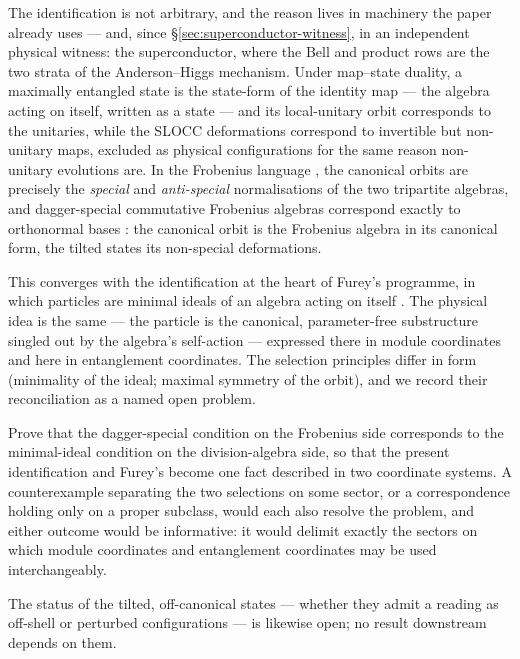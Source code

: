 The identification is not arbitrary, and the reason lives in machinery the paper already uses ---
and, since \S\ref{sec:superconductor-witness}, in an independent physical witness: the
superconductor, where the Bell and product rows are the two strata of the Anderson--Higgs
mechanism. Under
map--state duality, a maximally entangled state is the state-form of the identity map --- the algebra
acting on itself, written as a state --- and its local-unitary orbit corresponds to the unitaries,
while the SLOCC deformations correspond to invertible but non-unitary maps, excluded as physical
configurations for the same reason non-unitary evolutions are. In the Frobenius language
\autocite{coeckekissinger2010compositional}, the canonical orbits are precisely the \emph{special}
and \emph{anti-special} normalisations of the two tripartite algebras, and dagger-special commutative
Frobenius algebras correspond exactly to orthonormal bases
\autocite{coeckepavlovicvicary2013orthogonal}: the canonical orbit is the Frobenius algebra in its
canonical form, the tilted states its non-special deformations.

This converges with the identification at the heart of Furey's programme, in which particles are
minimal ideals of an algebra acting on itself \autocite{furey2012unified,furey2018three}. The
physical idea is the same --- the particle is the canonical, parameter-free substructure singled out
by the algebra's self-action --- expressed there in module coordinates and here in entanglement
coordinates. The selection principles differ in form (minimality of the ideal; maximal symmetry of
the orbit), and we record their reconciliation as a named open problem.

\begin{openproblem}\label{op:ideal-orbit}
Prove that the dagger-special condition on the Frobenius side corresponds to the minimal-ideal
condition on the division-algebra side, so that the present identification and Furey's become one
fact described in two coordinate systems. A counterexample separating the two selections on some
sector, or a correspondence holding only on a proper subclass, would each also resolve the problem,
and either outcome would be informative: it would delimit exactly the sectors on which module
coordinates and entanglement coordinates may be used interchangeably.
\end{openproblem}

The status of the tilted, off-canonical states --- whether they admit a reading as
off-shell or perturbed configurations --- is likewise open; no result downstream depends on them.

